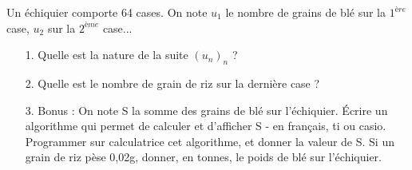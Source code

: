 \documentclass[12pt]{article}
\begin{document}
\begin{multicols}{2}
Un  échiquier comporte 64 cases. On note $u_1$ le nombre de grains de blé sur la $1^{ère}$ case, $u_2$ sur la $2^{ème}$ case...

\begin{enumerate}
\item[1.] Quelle est la nature de la suite $(u_n)_n$ ?
\item[2.] Quelle est le nombre de grain de riz sur la dernière case ?
\item[3.] Bonus : On note S la somme des grains de blé sur l'échiquier.
Écrire un algorithme qui permet de calculer et d’afficher S - en français, ti ou casio.
Programmer sur calculatrice cet algorithme, et donner la valeur de S. Si un grain de riz pèse 0,02g, donner, en tonnes, le poids de blé sur l'échiquier.
\end{enumerate}

\end{multicols}
\end{document}
